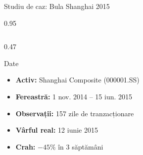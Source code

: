 \documentclass[9pt, aspectratio=169, t]{beamer}
\begin{document}
\begin{frame}{Studiu de caz: Bula Shanghai 2015}
    \begin{cminipage}{0.95\textwidth}
    {\footnotesize
    \begin{columns}[T]
        \begin{column}{0.47\textwidth}
            \begin{block}{Date}
                \begin{itemize}\setlength{\itemsep}{0pt}
                    \item \textbf{Activ:} Shanghai Composite (000001.SS)
                    \item \textbf{Fereastră:} 1 nov. 2014 -- 15 iun. 2015
                    \item \textbf{Observații:} 157 zile de tranzacționare
                    \item \textbf{Vârful real:} 12 iunie 2015
                    \item \textbf{Crah:} $-45\%$ în 3 săptămâni
                \end{itemize}
            \end{block}


\end{column}
\end{columns}}
\end{cminipage}
\end{frame}
\end{document}
